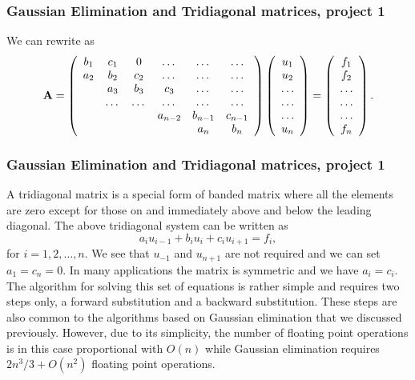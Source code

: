 \documentclass[compress]{beamer}
\begin{document}
\frame
{
  \frametitle{Gaussian Elimination and Tridiagonal matrices, project 1}
\begin{small}
{\scriptsize
We can rewrite as
\[
    {\bf A} = \left(\begin{array}{cccccc}
                           b_1& c_1 & 0 &\dots   & \dots &\dots \\
                           a_2 & b_2 & c_2 &\dots &\dots &\dots \\
                           & a_3 & b_3 & c_3 & \dots & \dots \\
                           & \dots   & \dots &\dots   &\dots & \dots \\
                           &   &  &a_{n-2}  &b_{n-1}& c_{n-1} \\
                           &    &  &   &a_n & b_n \\
                      \end{array} \right)\left(\begin{array}{c}
                           u_1\\
                           u_2\\
                           \dots \\
                          \dots  \\
                          \dots \\
                           u_n\\
                      \end{array} \right)
  =\left(\begin{array}{c}
                           f_1\\
                           f_2\\
                           \dots \\
                           \dots \\
                          \dots \\
                           f_n\\
                      \end{array} \right).
\]
}
\end{small}
}


\frame
{
  \frametitle{Gaussian Elimination and Tridiagonal matrices, project 1}
\begin{small}
{\scriptsize
A tridiagonal matrix is a special form of banded matrix where all the elements are zero except for
those on and immediately above and below the leading diagonal.
The above tridiagonal system   can be written as
\[
  a_iu_{i-1}+b_iu_i+c_iu_{i+1} = f_i,
\]
for $i=1,2,\dots,n$. We see that $u_{-1}$ and $u_{n+1}$ are not required and we can set $a_1=c_n=0$.
In many applications the matrix is symmetric and we have $a_i=c_i$.
The algorithm for solving this set of equations is rather simple and requires two steps only,
a forward substitution and a backward substitution. These steps are also
common to the algorithms based on
Gaussian elimination that
we discussed previously. However, due to its simplicity, the number of floating point operations
is in this
case proportional with $O(n)$ while Gaussian elimination requires $2n^3/3+O(n^2)$ floating point operations.
}
\end{small}
}
\end{document}
